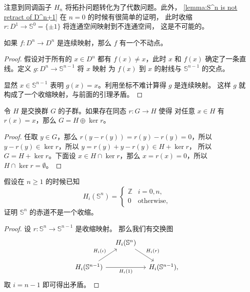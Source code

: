 \documentclass[fontset=none]{Notes}
\begin{document}
注意到同调函子 $H_n$ 将拓扑问题转化为了代数问题。此外，
\autoref{lemma:S^n is not retract of D^n+1} 在 $n=0$ 的时候有很简单的证明，
此时收缩 $r:D^1\to \mathbb{S}^0=\{\pm 1\}$ 将连通空间映射到不连通空间，
这是不可能的。

\begin{theorem}[Brouwer]\label{thm:Brouwer}
  如果 $f:D^n\to D^n$ 是连续映射，那么 $f$ 有一个不动点。
\end{theorem}
\begin{proof}
  假设对于所有的 $x\in D^n$ 都有 $f(x)\neq x$，此时 $x$ 和 $f(x)$
  确定了一条直线。定义 $g:D^n\to \mathbb{S}^{n-1}$ 将 $x$ 映射
  为 $f(x)$ 到 $x$ 的射线与 $\mathbb{S}^{n-1}$ 的交点。
  \begin{center}
  \end{center}
  显然
  $x\in \mathbb{S}^{n-1}$ 表明 $g(x)=x$。利用坐标不难计算得 $g$ 
  是连续映射。
  这样 $g$ 就构成了一个收缩映射，与前面的引理矛盾。
\end{proof}

\begin{problem}{}{}
令 $H$ 是交换群 $G$ 的子群。如果存在同态 $r:G\to H$ 使得
对任意 $x\in H$ 有 $r(x)=x$，那么 $G=H\oplus \ker r$。  
\end{problem}
\begin{proof}
  任取 $y\in G$，那么 $r(y-r(y))=r(y)-r(y)=0$，所以
  $y-r(y)\in\ker r$，所以 $y=r(y)+y-r(y)\in H+\ker r$，
  所以 $G=H+\ker r$。下面设 $x\in H\cap\ker r$，那么
  $x=r(x)=0$，所以 $H\cap\ker r=\emptyset$。
\end{proof}

\begin{problem}{}{}
  假设在 $n\geq 1$ 的时候已知
  \[
    H_i(\mathbb{S}^n)=\begin{cases}
      \mathbb{Z} & i=0,n,\\
      0 & \text{otherwise},
    \end{cases}
  \]
  证明 $\mathbb{S}^{n}$ 的赤道不是一个收缩。
\end{problem}
\begin{proof}
  设 $r:\mathbb{S}^n\to \mathbb{S}^{n-1}$ 是收缩映射。
  那么我们有交换图
  \[
    \begin{tikzcd}[column sep=1em]
      & H_i(\mathbb{S}^{n})\arrow[dr,"H_i(r)"] & \\
      H_i(\mathbb{S}^{n-1})\arrow[ur,"H_i(\iota)"]\arrow[rr,"H_i(1)"'] & & 
      H_i(\mathbb{S}^{n-1}),
    \end{tikzcd}
  \]
  取 $i=n-1$ 即可得出矛盾。
\end{proof}
\end{document}
